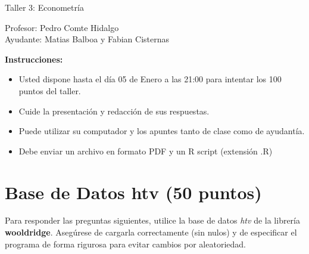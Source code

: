 \documentclass[letterpaper,11pt]{article}
\begin{document}
\begin{center}
    {\Large  Taller 3: Econometría }

Profesor:    Pedro Comte Hidalgo\\
Ayudante: Matias Balboa y Fabian Cisternas
\end{center}

\textbf{Instrucciones:} 

\begin{itemize}
    \item Usted dispone hasta el día 05 de Enero a las 21:00  para intentar los 100 puntos del taller.
    \item Cuide la presentación y redacción de sus respuestas.
    \item Puede utilizar su computador y los apuntes tanto de clase como de ayudantía.
    \item Debe enviar un archivo en formato PDF y un R script (extensión .R)
\end{itemize}

\section{Base de Datos htv (50 puntos)}

Para responder las preguntas siguientes, utilice la base de datos \textit{htv} de la librería \textbf{wooldridge}. Asegúrese de cargarla correctamente (sin nulos) y de especificar el programa de forma rigurosa para evitar cambios por aleatoriedad.
\end{document}

